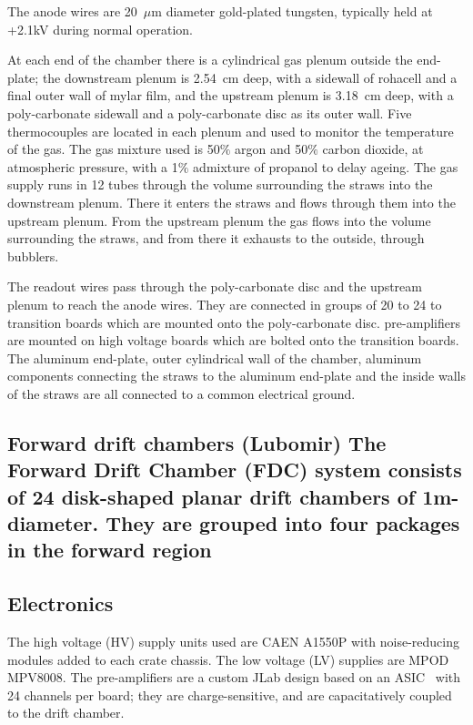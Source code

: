 The anode wires are 20~$\mu$m diameter gold-plated tungsten, typically held at +2.1kV during normal operation. 


At each end of the chamber there is a cylindrical gas plenum outside the end-plate; the downstream plenum is 2.54~cm deep, with a sidewall of rohacell and a final outer wall of mylar film, and the upstream plenum is 3.18~cm deep, with a poly-carbonate sidewall and a poly-carbonate disc as its outer wall. 
Five thermocouples are located in each plenum and used to monitor the temperature of the gas.
The gas mixture used is 50$\%$ argon and 50$\%$ carbon dioxide, at atmospheric pressure, with a 1$\%$ admixture of propanol to delay ageing.
The gas supply runs in 12 tubes through the volume surrounding the straws into the downstream plenum. 
There it enters the straws and flows through them into the upstream plenum. From the upstream plenum the gas flows into the volume surrounding the straws, and from there it exhausts to the outside, through bubblers.

The readout wires pass through the poly-carbonate disc and the upstream plenum to reach the anode wires. 
They are connected in groups of 20 to 24 to transition boards which are mounted onto the poly-carbonate disc. pre-amplifiers\cite{Barbosa2007} are mounted on high voltage boards which are bolted onto the transition boards. The aluminum end-plate, outer cylindrical wall of the chamber, aluminum components connecting the straws to the aluminum end-plate and the inside walls of the straws are all connected to a common electrical ground. 

\subsection{Forward drift chambers (Lubomir) The Forward Drift Chamber (FDC) system consists of 24 disk-shaped planar drift chambers of 1m-diameter.
They are grouped into four packages in the forward region 
\label{sec:fdc}}
\subsection{Electronics \label{sec:dcelectronics}}
The high voltage (HV) supply units used are CAEN A1550P with noise-reducing modules added to each crate chassis. 
The low voltage (LV) supplies are MPOD MPV8008. 
The pre-amplifiers are a custom JLab design based on an ASIC~\cite{Barbosa2008}
with 24 channels per board; they are charge-sensitive, and are capacitatively coupled to the drift chamber. 

